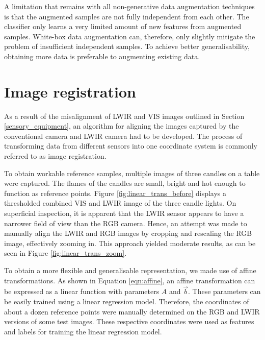\documentclass{l4proj}
\begin{document}
A limitation that remains with all non-generative data augmentation techniques is that the augmented samples are not fully independent from each other. The classifier only learns a very limited amount of new features from augmented samples. White-box data augmentation can, therefore, only slightly mitigate the problem of insufficient independent samples. To achieve better generalisability, obtaining more data is preferable to augmenting existing data.


\section{Image registration}
\label{image_registration}

As a result of the misalignment of LWIR and VIS images outlined in Section \ref{sensory_equipment}, an algorithm for aligning the images captured by the conventional camera and LWIR camera had to be developed. The process of transforming data from different sensors into one coordinate system is commonly referred to as image registration.

To obtain workable reference samples, multiple images of three candles on a table were captured. The flames of the candles are small, bright and hot enough to function as reference points. Figure \ref{fig:linear_trans_before} displays a thresholded combined VIS and LWIR image of the three candle lights. On superficial inspection, it is apparent that the LWIR sensor appears to have a narrower field of view than the RGB camera. Hence, an attempt was made to manually align the LWIR and RGB images by cropping and rescaling the RGB image, effectively zooming in. This approach yielded moderate results, as can be seen in Figure \ref{fig:linear_trans_zoom}.

To obtain a more flexible and generalisable representation, we made use of affine transformations. As shown in Equation \ref{eqn:affine}, an affine transformation can be expressed as a linear function with parameters $A$ and $\vec{b}$. These parameters can be easily trained using a linear regression model. Therefore, the coordinates of about a dozen reference points were manually determined on the RGB and LWIR versions of some test images. These respective coordinates were used as features and labels for training the linear regression model. 
\end{document}
